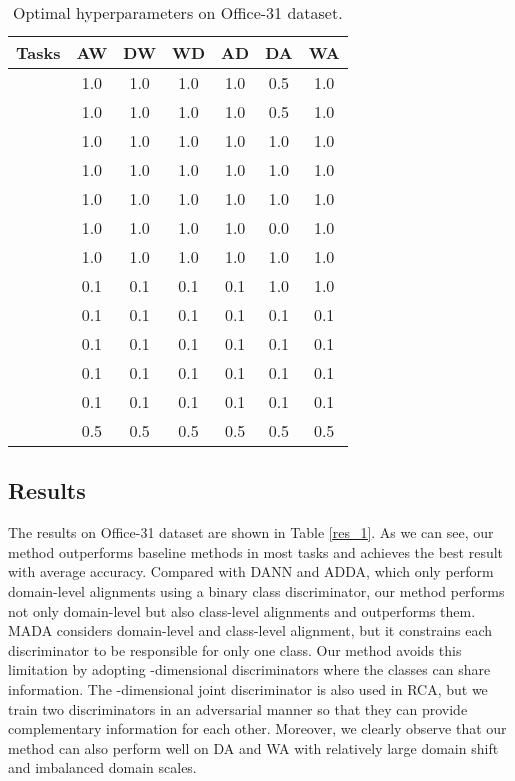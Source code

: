 \documentclass{ecai}
\begin{document}
\begin{table}
\centering
\caption{Optimal hyperparameters on Office-31 dataset.}
\begin{tabular}{ccccccc}
\toprule
Tasks&   AW&   DW&   WD&   AD&   DA&   WA \\
\midrule
&   1.0& 1.0& 1.0& 1.0& 0.5& 1.0\\
&   1.0& 1.0& 1.0& 1.0& 0.5& 1.0\\
&   1.0& 1.0& 1.0& 1.0& 1.0& 1.0\\
&   1.0& 1.0& 1.0& 1.0& 1.0& 1.0\\
&      1.0& 1.0& 1.0& 1.0& 1.0& 1.0\\
&   1.0& 1.0& 1.0& 1.0& 0.0& 1.0\\
&   1.0& 1.0& 1.0& 1.0& 1.0& 1.0\\
&     0.1& 0.1& 0.1& 0.1& 1.0& 1.0\\
&   0.1& 0.1& 0.1& 0.1& 0.1& 0.1\\
&   0.1& 0.1& 0.1& 0.1& 0.1& 0.1\\
&   0.1& 0.1& 0.1& 0.1& 0.1& 0.1\\
&   0.1& 0.1& 0.1& 0.1& 0.1& 0.1\\
&         0.5& 0.5& 0.5& 0.5& 0.5& 0.5\\
\bottomrule
\end{tabular}
\label{param}
\end{table}


\subsection{Results}
The results on Office-31 dataset are shown in Table \ref{res_1}. As we can see, our method outperforms baseline methods in most tasks and achieves the best result with average accuracy. Compared with DANN and ADDA, which only perform domain-level alignments using a binary class discriminator, our method performs not only domain-level but also class-level alignments and outperforms them. MADA considers domain-level and class-level alignment, but it constrains each discriminator to be responsible for only one class. Our method avoids this limitation by adopting  -dimensional discriminators where the classes can share information. The -dimensional joint discriminator is also used in RCA, but we train two discriminators in an adversarial manner so that they can provide  complementary information for each other. Moreover, we clearly observe that our method can also perform well on DA and  WA with relatively large domain shift and imbalanced domain scales.
\end{document}
